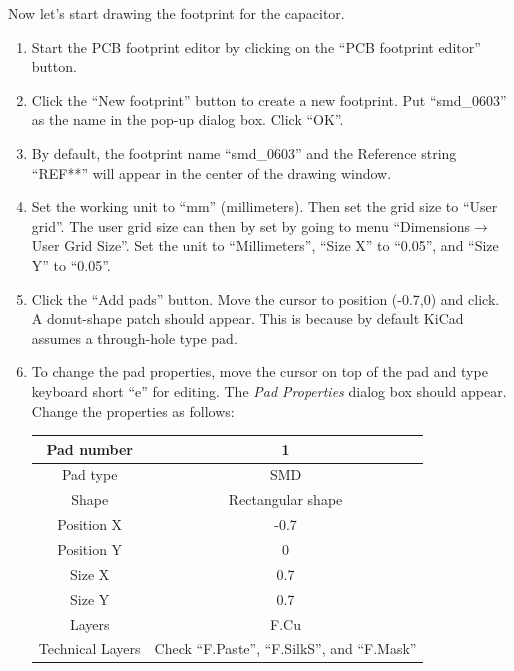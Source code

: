 \documentclass[12pt,letterpaper]{scrartcl}
\begin{document}
Now let's start drawing the footprint for the capacitor. 
\begin{enumerate}
	\item Start the PCB footprint editor by clicking on the ``PCB footprint editor'' button. 
	
	\item Click the ``New footprint'' button to create a new footprint. Put ``smd\_0603'' as the name in the pop-up dialog box. Click ``OK''. 
	
	\item By default, the footprint name ``smd\_0603'' and the Reference string ``REF**'' will appear in the center of the drawing window. 
	
	\item Set the working unit to ``mm'' (millimeters). Then set the grid size to ``User grid''. The user grid size can then by set by going to menu ``Dimensions$\rightarrow$ User Grid Size''. Set the unit to ``Millimeters'', ``Size X'' to ``0.05'', and ``Size Y'' to ``0.05''.
	
	\item Click the ``Add pads'' button. Move the cursor to position (-0.7,0) and click. A donut-shape patch should appear. This is because by default KiCad assumes a through-hole type pad. 
	
	\item To change the pad properties, move the cursor on top of the pad and type keyboard short ``e'' for editing. The \emph{Pad Properties} dialog box should appear. Change the properties as follows:
		\begin{table}[h]
			\centering
			\begin{tabular}{|c|c|}
				\hline  Pad number & 1 \\ 
				\hline  Pad type & SMD \\ 
				\hline  Shape & Rectangular shape \\ 
				\hline  Position X & -0.7 \\ 
				\hline  Position Y & 0  \\ 
				\hline  Size X & 0.7 \\ 
				\hline  Size Y & 0.7  \\ 
				\hline  Layers & F.Cu \\ 
				\hline  Technical Layers & Check ``F.Paste'', ``F.SilkS'', and ``F.Mask''  \\ 
				\hline 
			\end{tabular} 
		\end{table}
	

\end{enumerate}
\end{document}
